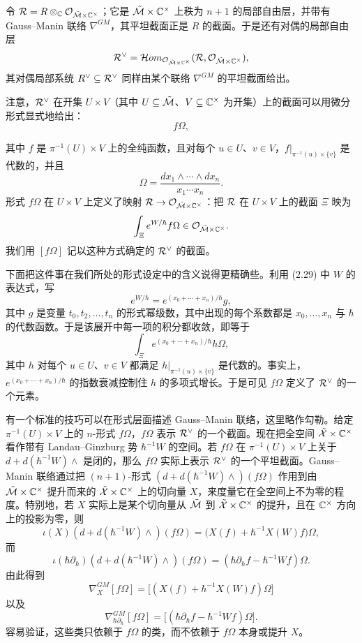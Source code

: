 令 $\mathcal{R}=R\otimes_{\mathbb{C}}\mathcal{O}_{\tilde{\mathcal{M}}\times\mathbb{C}^\times}$；它是 $\tilde{\mathcal{M}}\times\mathbb{C}^\times$ 上秩为 $n+1$ 的局部自由层，并带有 Gauss--Manin 联络 $\nabla^{GM}$，其平坦截面正是 $R$ 的截面。于是还有对偶的局部自由层
\[
  \mathcal{R}^\vee=\mathcal{H}om_{\mathcal{O}_{\tilde{\mathcal{M}}\times\mathbb{C}^\times}}(\mathcal{R},\mathcal{O}_{\tilde{\mathcal{M}}\times\mathbb{C}^\times}),
\]
其对偶局部系统 $R^\vee\subseteq\mathcal{R}^\vee$ 同样由某个联络 $\nabla^{GM}$ 的平坦截面给出。

注意，$\mathcal{R}^\vee$ 在开集 $U\times V$（其中 $U\subseteq\tilde{\mathcal{M}}$、$V\subseteq\mathbb{C}^\times$ 为开集）上的截面可以用微分形式显式地给出：
\[
  f\Omega,
\]

其中 $f$ 是 $\pi^{-1}(U)\times V$ 上的全纯函数，且对每个 $u\in U$、$v\in V$，$f|_{\pi^{-1}(u)\times\{v\}}$ 是代数的，并且
\[
  \Omega=\frac{dx_1\wedge\cdots\wedge dx_n}{x_1\cdots x_n}.
\]
形式 $f\Omega$ 在 $U\times V$ 上定义了映射 $\mathcal{R}\to\mathcal{O}_{\tilde{\mathcal{M}}\times\mathbb{C}^\times}$：把 $\mathcal{R}$ 在 $U\times V$ 上的截面 $\Xi$ 映为
\[
  \int_\Xi e^{W/\hbar}f\Omega\in\mathcal{O}_{\tilde{\mathcal{M}}\times\mathbb{C}^\times}.
\]
我们用 $[f\Omega]$ 记以这种方式确定的 $\mathcal{R}^\vee$ 的截面。

下面把这件事在我们所处的形式设定中的含义说得更精确些。利用 (2.29) 中 $W$ 的表达式，写
\[
  e^{W/\hbar}=e^{(x_0+\cdots+x_n)/\hbar}g,
\]
其中 $g$ 是变量 $t_0,t_2,\ldots,t_n$ 的形式幂级数，其中出现的每个系数都是 $x_0,\ldots,x_n$ 与 $\hbar$ 的代数函数。于是该展开中每一项的积分都收敛，即等于
\[
  \int_\Xi e^{(x_0+\cdots+x_n)/\hbar}h\Omega,
\]
其中 $h$ 对每个 $u\in U$、$v\in V$ 都满足 $h|_{\pi^{-1}(u)\times\{v\}}$ 是代数的。事实上，$e^{(x_0+\cdots+x_n)/\hbar}$ 的指数衰减控制住 $h$ 的多项式增长。于是可见 $f\Omega$ 定义了 $\mathcal{R}^\vee$ 的一个元素。

有一个标准的技巧可以在形式层面描述 Gauss--Manin 联络，这里略作勾勒。给定 $\pi^{-1}(U)\times V$ 上的 $n$-形式 $f\Omega$，$f\Omega$ 表示 $\mathcal{R}^\vee$ 的一个截面。现在把全空间 $\tilde{\mathcal{X}}\times\mathbb{C}^\times$ 看作带有 Landau--Ginzburg 势 $\hbar^{-1}W$ 的空间。若 $f\Omega$ 在 $\pi^{-1}(U)\times V$ 上关于 $d+d(\hbar^{-1}W)\wedge$ 是闭的，那么 $f\Omega$ 实际上表示 $\mathcal{R}^\vee$ 的一个平坦截面。Gauss--Manin 联络通过把 $(n+1)$-形式 $(d+d(\hbar^{-1}W)\wedge)(f\Omega)$ 作用到由 $\tilde{\mathcal{M}}\times\mathbb{C}^\times$ 提升而来的 $\tilde{\mathcal{X}}\times\mathbb{C}^\times$ 上的切向量 $X$，来度量它在全空间上不为零的程度。特别地，若 $X$ 实际上是某个切向量从 $\tilde{\mathcal{M}}$ 到 $\tilde{\mathcal{X}}\times\mathbb{C}^\times$ 的提升，且在 $\mathbb{C}^\times$ 方向上的投影为零，则
\[
  \iota(X)(d+d(\hbar^{-1}W)\wedge)(f\Omega)
  =\bigl(X(f)+\hbar^{-1}X(W)f\bigr)\Omega,
\]
而
\[
  \iota(\hbar\partial_\hbar)(d+d(\hbar^{-1}W)\wedge)(f\Omega)
  =(\hbar\partial_\hbar f-\hbar^{-1}Wf)\Omega.
\]
由此得到
\begin{equation}
  \nabla^{GM}_X[f\Omega]=\bigl[(X(f)+\hbar^{-1}X(W)f)\Omega\bigr] \tag{2.30}
\end{equation}
以及
\begin{equation}
  \nabla^{GM}_{\hbar\partial_\hbar}[f\Omega]
  =\bigl[(\hbar\partial_\hbar f-\hbar^{-1}Wf)\Omega\bigr]. \tag{2.31}
\end{equation}
容易验证，这些类只依赖于 $f\Omega$ 的类，而不依赖于 $f\Omega$ 本身或提升 $X$。

